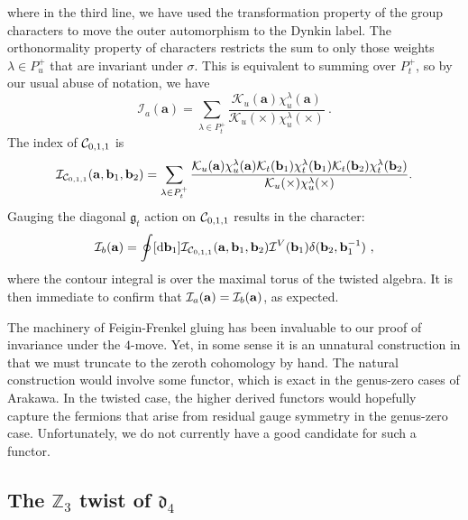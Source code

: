 \documentclass[a4paper]{article}
\def\IZ{\mathbb{Z}}
\def\CC{{\cal C}}
\def\II{{\cal I}}
\def\KK{{\cal K}}
\def\df{\mathfrak{d}}
\def\gf{\mathfrak{g}}
\begin{document}
where in the third line, we have used the transformation property of the group characters to move the outer automorphism to the Dynkin label. The orthonormality property of characters restricts the sum to only those weights $\lambda\in P_u^+$ that are invariant under $\sigma$. This is equivalent to summing over $P_t^+$, so by our usual abuse of notation, we have
\begin{equation}
    \mathcal{I}_a(\mathbf{a}) = \sum_{\lambda\in P_t^+}\frac{\mathcal{K}_u(\mathbf{a})\chi^\lambda_u(\mathbf{a})}{\mathcal{K}_u(\times)\chi^\lambda_u(\times)}~.
\end{equation}
The index of $\CC_{0,1,1}$ is
\begin{equation}
    \II_{\CC_{0,1,1}}(\mathbf{a},\mathbf{b}_1,\mathbf{b}_2) = \sum_{\lambda\in P_t^+} \frac{\KK_u(\mathbf{a})\chi_u^\lambda(\mathbf{a})\KK_t(\mathbf{b}_1)\chi_t^\lambda(\mathbf{b}_1) \KK_t(\mathbf{b}_2)\chi_t^\lambda(\mathbf{b}_2)}{\KK_u(\times)\chi_u^\lambda(\times)}.
\end{equation}
Gauging the diagonal $\gf_t$ action on $\CC_{0,1,1}$ results in the character:
\begin{equation}
    \II_b(\mathbf{a}) = \oint[\mathrm{d}\mathbf{b}_1] \II_{\CC_{0,1,1}}(\mathbf{a},\mathbf{b}_1,\mathbf{b}_2)\II^V(\mathbf{b}_1)\delta(\mathbf{b}_2,\mathbf{b}_1^{-1})~,
\end{equation}
where the contour integral is over the maximal torus of the twisted algebra. It is then immediate to confirm that $\II_a(\mathbf{a})=\II_b(\mathbf{a})$, as expected.

The machinery of Feigin-Frenkel gluing has been invaluable to our proof of invariance under the $4$-move. Yet, in some sense it is an unnatural construction in that we must truncate to the zeroth cohomology by hand. The natural construction would involve some functor, which is exact in the genus-zero cases of Arakawa. In the twisted case, the higher derived functors would hopefully capture the fermions that arise from residual gauge symmetry in the genus-zero case. Unfortunately, we do not currently have a good candidate for such a functor.

\subsection{\label{ssec:z3-twist}The \texorpdfstring{$\IZ_3$}{Z3} twist of \texorpdfstring{$\df_4$}{d4}}
\end{document}
